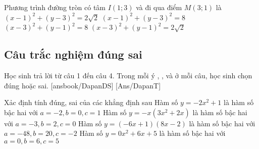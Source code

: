 \begin{ex}%
Phương trình đường tròn có tâm $I(1 ; 3)$ và đi qua điểm $M(3 ; 1)$ là
\choice
{$(x-1)^2+(y-3)^2=2 \sqrt{2}$}
{\True $(x-1)^2+(y-3)^2=8$}
{$(x-3)^2+(y-1)^2=8$}
{$(x-3)^2+(y-1)^2=2 \sqrt{2}$}
\end{ex}
  


\subsection{Câu trắc nghiệm đúng sai}
Học sinh trả lời từ câu 1 đến câu 4.
Trong mỗi ý , ,  và  ở mỗi câu, học sinh chọn đúng hoặc sai.
\setcounter{ex}{0}
\LGexTF
{}[ansbook/DapanDS]
[Ans/DapanT]
\begin{ex}%
	Xảc định tính đúng, sai của các khẳng định sau
	\choiceTF
	{\True Hàm số $y=-2 x^2+1$ là hàm số bậc hai với $a=-2, b=0, c=1$ }
	{ Hàm số $y=-x\left(3 x^2+2 x\right)$ là hàm số bậc hai với $a=-3, b=2, c=0$}
	{\True Hàm số $y=(-6 x+1)(8 x-2)$ là hàm số bậc hai với $a=-48, b=20, c=-2$}
	{  Hàm số $y=0 x^2+6 x+5$ là hàm số bậc hai với $a=0, b=6, c=5$ } 
\end{ex}

